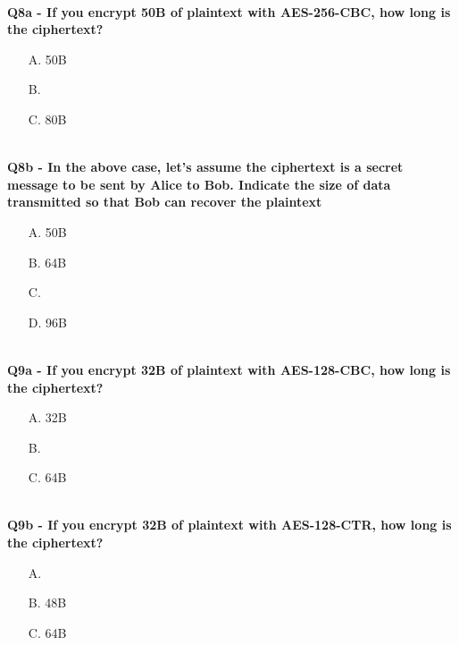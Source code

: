 \textbf{\\Q8a - If you encrypt 50B of plaintext with AES-256-CBC, how long is the ciphertext?}
\begin{enumerate}
    \item[A.] 50B
    \item[B.] 
    \item[C.] 80B
\end{enumerate}


\textbf{\\Q8b - In the above case, let’s assume the ciphertext is a secret message to be sent by Alice to Bob. Indicate the size of data transmitted so that Bob can recover the plaintext}
\begin{enumerate}
    \item[A.] 50B
    \item[B.] 64B
    \item[C.] 
    \item[D.] 96B
\end{enumerate}

\textbf{\\Q9a - If you encrypt 32B of plaintext with AES-128-CBC, how long is the ciphertext?}
\begin{enumerate}
    \item[A.] 32B
    \item[B.] 
    \item[C.] 64B
\end{enumerate}

\textbf{\\Q9b - If you encrypt 32B of plaintext with AES-128-CTR, how long is the ciphertext?}
\begin{enumerate}
    \item[A.] 
    \item[B.] 48B
    \item[C.] 64B
\end{enumerate}

